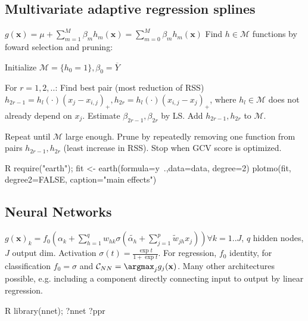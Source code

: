 \subsection{Multivariate adaptive regression splines}%
\label{sub:multivariate_adaptive_regression_splines}
\begin{sectionbox}\nospacing{}
  $g(\mathbf{x}) = \mu + \sum_{m=1}^{M}\beta_m h_m(\mathbf{x}) = \sum_{m=0}^{M}\beta_m h_m(\mathbf{x}) $
  Find $h \in \mathcal{M}$ functions by foward selection and pruning:

  \begin{enumeratenosep}[label=\roman*]
    \item Initialize $\mathcal{M} = \{ h_0 = 1\}, \beta_0 = \overline{Y}$
    \item For $r=1,2,..$: Find best pair (most reduction of RSS) $h_{2r-1}=h_l(\cdot)(x_j-x_{i,j})_{+}, h_{2r}=h_l(\cdot)(x_{i,j}-x_j)_{+}$, where $h_l \in \mathcal{M}$ does not already depend on $x_j$. Estimate $\beta_{2r-1}, \beta_{2r}$ by LS. Add $h_{2r-1}, h_{2r}$ to $\mathcal{M}$.
    \item Repeat until $\mathcal{M}$ large enough. Prune by repeatedly removing one function from pairs $h_{2r-1}, h_{2r}$ (least increase in RSS). Stop when GCV score is optimized.
  \end{enumeratenosep}
  \begin{mintlinebox}{R}
    require("earth"); 
    fit <- earth(formula=y~.,data=data, degree=2)
    plotmo(fit, degree2=FALSE, caption="main effects")
  \end{mintlinebox}
\end{sectionbox}	

\subsection{Neural Networks}%
\label{sub:neural_networks}
\begin{sectionbox}\nospacing{}
  $g(\mathbf{x})_k = f_0(\alpha_k + \sum_{h=1}^{q}w_{hk}\sigma(\tilde{\alpha_h} + \sum_{j=1}^{p}\tilde{w}_{jh}x_j)) \forall k=1..J$, $q$ hidden nodes, $J$ output dim. Activation $\sigma(t) = \frac{\exp t}{1 + \exp t}$. For regression, $f_0$ identity, for classification $f_0 = \sigma$ and $\mathcal{C}_{NN} = \argmax_{j} g_j(\mathbf{x})$. Many other architectures possible, e.g. including a component directly connecting input to output by linear regression.
  \begin{mintlinebox}{R}
    library(nnet); ?nnet ?ppr 
  \end{mintlinebox}
\end{sectionbox}

